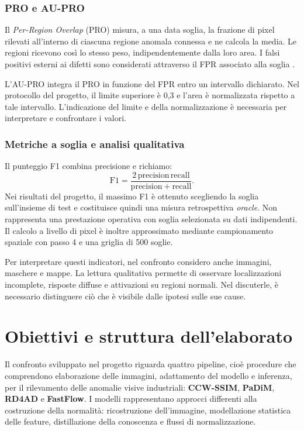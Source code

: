 \subsubsection{PRO e AU-PRO}

Il \textit{Per-Region Overlap} (PRO) misura, a una data soglia, la frazione di pixel rilevati all'interno di ciascuna regione anomala connessa e ne calcola la media. Le regioni ricevono così lo stesso peso, indipendentemente dalla loro area. I falsi positivi esterni ai difetti sono considerati attraverso il FPR associato alla soglia \cite{Zheng_et_al._2022}.

L'AU-PRO integra il PRO in funzione del FPR entro un intervallo dichiarato. Nel protocollo del progetto, il limite superiore è 0,3 e l'area è normalizzata rispetto a tale intervallo. L'indicazione del limite e della normalizzazione è necessaria per interpretare e confrontare i valori.

\subsubsection{Metriche a soglia e analisi qualitativa}

Il punteggio F1 combina precisione e richiamo:
\[
    \mathrm{F1}=
    \frac{2\,\mathrm{precision}\,\mathrm{recall}}
    {\mathrm{precision}+\mathrm{recall}}.
\]
Nei risultati del progetto, il massimo F1 è ottenuto scegliendo la soglia sull'insieme di test e costituisce quindi una misura retrospettiva \textit{oracle}. Non rappresenta una prestazione operativa con soglia selezionata su dati indipendenti. Il calcolo a livello di pixel è inoltre approssimato mediante campionamento spaziale con passo 4 e una griglia di 500 soglie.

Per interpretare questi indicatori, nel confronto considero anche immagini, maschere e mappe. La lettura qualitativa permette di osservare localizzazioni incomplete, risposte diffuse e attivazioni su regioni normali. Nel discuterle, è necessario distinguere ciò che è visibile dalle ipotesi sulle sue cause.

\section{Obiettivi e struttura dell'elaborato}

Il confronto sviluppato nel progetto riguarda quattro pipeline, cioè procedure che comprendono elaborazione delle immagini, adattamento del modello e inferenza, per il rilevamento delle anomalie visive industriali: \textbf{CCW-SSIM}, \textbf{PaDiM}, \textbf{RD4AD} e \textbf{FastFlow}. I modelli rappresentano approcci differenti alla costruzione della normalità: ricostruzione dell'immagine, modellazione statistica delle feature, distillazione della conoscenza e flussi di normalizzazione.


